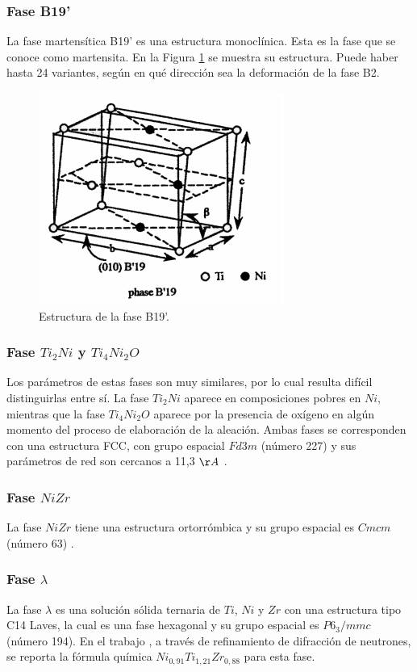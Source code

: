 \documentclass[12pt]{article}
\theoremstyle{definition}
\theoremstyle{remark}
\begin{document}
\subsubsection{Fase B19'}
La fase martensítica B19' es una estructura monoclínica. Esta es la fase que se conoce como martensita. En la Figura \ref{B19pPhase} se muestra su estructura. Puede haber hasta 24 variantes, según en qué dirección sea la deformación de la fase B2\citep{Santamarta}.
\begin{figure}[H]
	\centering
	\includegraphics[scale=0.5]{img/B19pPhase.png}
	\caption{Estructura de la fase B19'.}
	\label{B19pPhase}
\end{figure}

\subsubsection{Fase $Ti_2Ni$ y $Ti_4Ni_2O$}
\label{Ti2Ni}
Los parámetros de estas fases son muy similares, por lo cual resulta difícil distinguirlas entre sí. La fase $Ti_2Ni$ aparece en composiciones pobres en $Ni$, mientras que la fase $Ti_4Ni_2O$ aparece por la presencia de oxígeno en algún momento del proceso de elaboración de la aleación. Ambas fases se corresponden con una estructura FCC, con grupo espacial $Fd3m$ (número 227) y sus parámetros de red son cercanos a 11,3 $\AA$ \citep{ShapeMemoryMaterials}.

\subsubsection{Fase $NiZr$}
La fase $NiZr$ tiene una estructura ortorrómbica y su grupo espacial es $Cmcm$ (número 63) \citep{Kirkpatrick1962}.

\subsubsection{Fase $\lambda$}
La fase $\lambda$ es una solución sólida ternaria de $Ti$, $Ni$ y $Zr$ con una estructura tipo C14 Laves, la cual es una fase hexagonal y su grupo espacial es $P6_3/mmc$ (número 194). En el trabajo \citep{Bououdina2003}, a través de refinamiento de difracción de neutrones, se reporta la fórmula química $Ni_{0,91}Ti_{1,21}Zr_{0,88}$ para esta fase.
\end{document}
